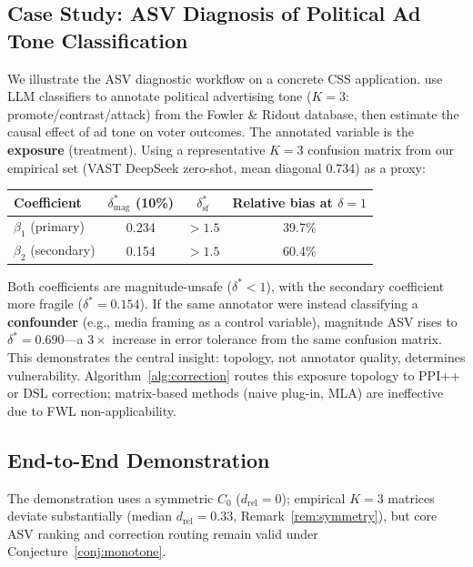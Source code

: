 \subsection{Case Study: ASV Diagnosis of Political Ad Tone Classification}
\label{sec:asv_case_study}

We illustrate the ASV diagnostic workflow on a concrete CSS application. \citet{egami_hinck_stewart_wei2023} use LLM classifiers to annotate political advertising tone ($K{=}3$: promote/contrast/attack) from the Fowler \& Ridout database, then estimate the causal effect of ad tone on voter outcomes. The annotated variable is the \textbf{exposure} (treatment). Using a representative $K{=}3$ confusion matrix from our empirical set (VAST DeepSeek zero-shot, mean diagonal 0.734) as a proxy:

\begin{center}
\small
\begin{tabular}{lccc}
\toprule
Coefficient & $\delta^*_{\text{mag}}$ (10\%) & $\delta^*_{\text{sf}}$ & Relative bias at $\delta{=}1$ \\
\midrule
$\beta_1$ (primary) & 0.234 & $> 1.5$ & 39.7\% \\
$\beta_2$ (secondary) & 0.154 & $> 1.5$ & 60.4\% \\
\bottomrule
\end{tabular}
\end{center}

Both coefficients are magnitude-unsafe ($\delta^* < 1$), with the secondary coefficient more fragile ($\delta^*{=}0.154$). If the same annotator were instead classifying a \textbf{confounder} (e.g., media framing as a control variable), magnitude ASV rises to $\delta^*{=}0.690$---a $3{\times}$ increase in error tolerance from the same confusion matrix. This demonstrates the central insight: topology, not annotator quality, determines vulnerability. Algorithm~\ref{alg:correction} routes this exposure topology to PPI++ or DSL correction; matrix-based methods (naive plug-in, MLA) are ineffective due to FWL non-applicability.

\subsection{End-to-End Demonstration}
\label{sec:e2e_demo}



The demonstration uses a symmetric $C_0$ ($d_{\mathrm{rel}}{=}0$); empirical $K{=}3$ matrices deviate substantially (median $d_{\mathrm{rel}}{=}0.33$, Remark~\ref{rem:symmetry}), but core ASV ranking and correction routing remain valid under Conjecture~\ref{conj:monotone}.

